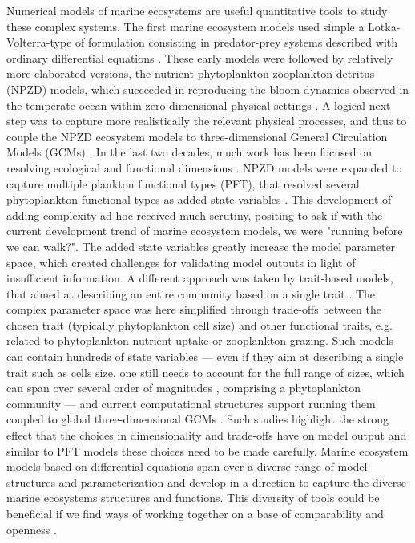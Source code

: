 \documentclass[journal abbreviation, manuscript]{copernicus}
\begin{document}
Numerical models of marine ecosystems are useful quantitative tools to study these complex systems. The first marine ecosystem models used simple a Lotka-Volterra-type of formulation consisting in predator-prey systems described with ordinary differential equations \citep{Fleming1939, Riley1946FactorsBank}. These early models were followed by relatively more elaborated versions, the nutrient-phytoplankton-zooplankton-detritus (NPZD) models, which succeeded in reproducing the bloom dynamics observed in the temperate ocean within zero-dimensional physical settings \citep{Evans1985ACycles, Fasham1990a}. A logical next step was to capture more realistically the relevant physical processes, and thus to couple the NPZD ecosystem models to three-dimensional General Circulation Models (GCMs) \citep[e.g.][]{Sarmiento1993AZone}. In the last two decades, much work has been focused on resolving ecological and functional dimensions \citep{Follows2011ModelingMicrobes}. NPZD models were expanded to capture multiple plankton functional types (PFT), that resolved several phytoplankton functional types as added state variables \citep{LeQuere2005}. This development of adding complexity ad-hoc received much scrutiny, positing \citet{Anderson2005} to ask if with the current development trend of marine ecosystem models, we were "running before we can walk?". The added state variables greatly increase the model parameter space, which created challenges for validating model outputs in light of insufficient information. A different approach was taken by trait-based models, that aimed at describing an entire community based on a single trait \citep{Bruggeman2007a, Merico2009, Follows2007EmergentOcean}. The complex parameter space was here simplified through trade-offs between the chosen trait (typically phytoplankton cell size) and other functional traits, e.g. related to phytoplankton nutrient uptake or zooplankton grazing.
Such models can contain hundreds of state variables — even if they aim at describing a single trait such as cells size, one still needs to account for the full range of sizes, which can span over several order of magnitudes \citep{Finkel2010}, comprising a phytoplankton community — and current computational structures support running them coupled to global three-dimensional GCMs \citep{Dutkiewicz2020DimensionsDiversity}. Such studies highlight the strong effect that the choices in dimensionality and trade-offs have on model output and similar to PFT models these choices need to be made carefully.
Marine ecosystem models based on differential equations span over a diverse range of model structures and parameterization and develop in a direction to capture the diverse marine ecosystems structures and functions. This diversity of tools could be beneficial if we find ways of working together on a base of comparability and openness \citep{Heymans2020TheChallenge}.
\end{document}
